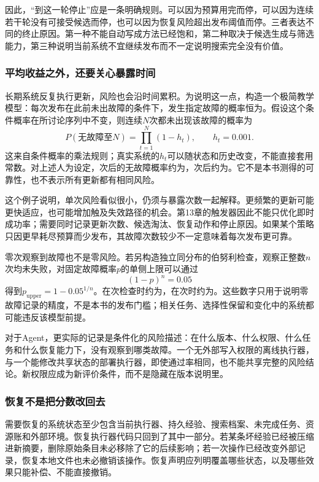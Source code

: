 因此，“到这一轮停止”应是一条明确规则。可以因为预算用完而停，可以因为连续若干轮没有可接受候选而停，也可以因为恢复风险超出发布阈值而停。三者表达不同的终止原因。第一种不能自动写成方法已经饱和，第二种取决于候选生成与筛选能力，第三种说明当前系统不宜继续发布而不一定说明搜索完全没有价值。

\subsubsection{平均收益之外，还要关心暴露时间}

长期系统反复执行更新，风险也会沿时间累积。为说明这一点，构造一个极简教学模型：每次发布在此前未出故障的条件下，发生指定故障的概率恒为。假设这个条件概率在所讨论序列中不变，则连续$N$次都未出现该故障的概率为
\[
 P(\text{无故障至}N)=\prod_{t=1}^{N}(1-h_t),\qquad h_t=0.001.
\]
这来自条件概率的乘法规则；真实系统的$h_t$可以随状态和历史改变，不能直接套用常数。对上述人为设定，次后的无故障概率约为，次后约为。它不是本书测得的可靠性，也不表示所有更新都有相同风险。

这个例子说明，单次风险看似很小，仍须与暴露次数一起解释。更频繁的更新可能更快适应，也可能增加触及失效路径的机会。第13章的触发器因此不能只优化即时成功率；需要同时记录更新次数、候选淘汰、恢复动作和停止原因。如果某个策略只因更早耗尽预算而少发布，其故障次数较少不一定意味着每次发布更可靠。

零次观察到故障也不是零风险。若另构造独立同分布的伯努利检查，观察正整数$n$次均未失败，对固定故障概率$p$的单侧上限可以通过
\[
 (1-p)^n=0.05
\]
得到$p_{\mathrm{upper}}=1-0.05^{1/n}$。在次检查时约为，在次时约为。这些数字只用于说明零故障记录的精度，不是本书的发布门槛；相关任务、选择性保留和变化中的系统都可能违反该模型前提。

对于Agent，更实际的记录是条件化的风险描述：在什么版本、什么权限、什么任务和什么恢复能力下，没有观察到哪类故障。一个无外部写入权限的离线执行器，与一个能修改共享状态的部署执行器，即使通过率相同，也不能共享完整的风险结论。新权限应成为新评价条件，而不是隐藏在版本说明里。

\subsubsection{恢复不是把分数改回去}

需要恢复的系统状态至少包含当前执行器、持久经验、搜索档案、未完成任务、资源账和外部环境。恢复执行器代码只回到了其中一部分。若某条坏经验已经被压缩进新摘要，删除原始条目未必移除了它的后续影响；若一次操作已经改变外部记录，恢复本地文件也未必撤销该操作。恢复声明应列明覆盖哪些状态，以及哪些效果只能补偿、不能直接撤销。

